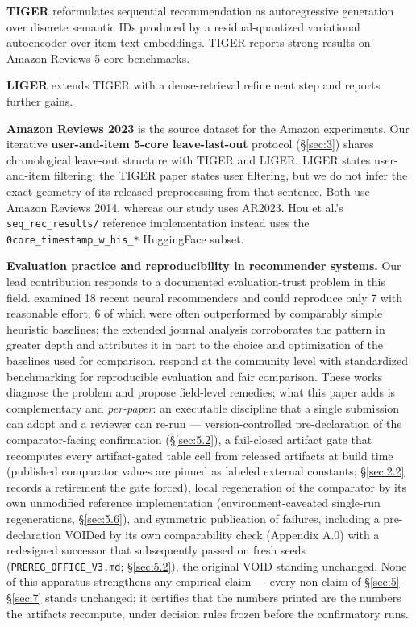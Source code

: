 \textbf{TIGER} \citep{rajput2023tiger} reformulates sequential recommendation as autoregressive generation over discrete semantic IDs produced by a residual-quantized variational autoencoder over item-text embeddings. TIGER reports strong results on Amazon Reviews 5-core benchmarks.

\textbf{LIGER} \citep{yang2024liger} extends TIGER with a dense-retrieval refinement step and reports further gains.

\textbf{Amazon Reviews 2023} \citep{hou2024blair} is the source dataset for the Amazon experiments. Our iterative \textbf{user-and-item 5-core leave-last-out} protocol (\S\ref{sec:3}) shares chronological leave-out structure with TIGER and LIGER. LIGER states user-and-item filtering; the TIGER paper states user filtering, but we do not infer the exact geometry of its released preprocessing from that sentence. Both use Amazon Reviews 2014, whereas our study uses AR2023. Hou et al.'s \texttt{seq\_rec\_results/} reference implementation instead uses the \texttt{0core\_timestamp\_w\_his\_*} HuggingFace subset.

\textbf{Evaluation practice and reproducibility in recommender systems.} Our lead contribution responds to a documented evaluation-trust problem in this field. \citet{ferraridacrema2019worrying} examined 18 recent neural recommenders and could reproduce only 7 with reasonable effort, 6 of which were often outperformed by comparably simple heuristic baselines; the extended journal analysis \citep{ferraridacrema2021troubling} corroborates the pattern in greater depth and attributes it in part to the choice and optimization of the baselines used for comparison. \citet{sun2020rigorous} respond at the community level with standardized benchmarking for reproducible evaluation and fair comparison. These works diagnose the problem and propose field-level remedies; what this paper adds is complementary and \emph{per-paper}: an executable discipline that a single submission can adopt and a reviewer can re-run --- version-controlled pre-declaration of the comparator-facing confirmation (\S\ref{sec:5.2}), a fail-closed artifact gate that recomputes every artifact-gated table cell from released artifacts at build time (published comparator values are pinned as labeled external constants; \S\ref{sec:2.2} records a retirement the gate forced), local regeneration of the comparator by its own unmodified reference implementation (environment-caveated single-run regenerations, \S\ref{sec:5.6}), and symmetric publication of failures, including a pre-declaration VOIDed by its own comparability check (Appendix A.0) with a redesigned successor that subsequently passed on fresh seeds (\texttt{PREREG\_OFFICE\_V3.md}; \S\ref{sec:5.2}), the original VOID standing unchanged. None of this apparatus strengthens any empirical claim --- every non-claim of \S\ref{sec:5}--\S\ref{sec:7} stands unchanged; it certifies that the numbers printed are the numbers the artifacts recompute, under decision rules frozen before the confirmatory runs.



